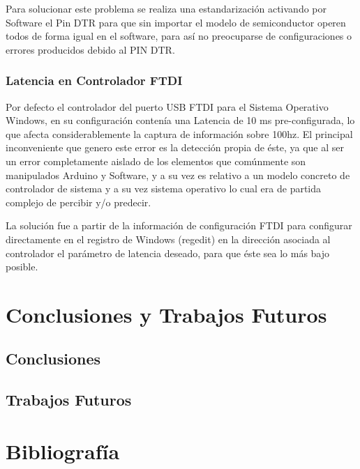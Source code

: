 \documentclass[12pt,a4paper]{article}
\begin{document}
Para solucionar este problema se realiza una estandarización activando por Software el Pin DTR para que sin importar el modelo de semiconductor operen todos de forma igual en el software, para así no preocuparse de configuraciones o errores producidos debido al PIN DTR.

\subsubsection{Latencia en Controlador FTDI}
Por defecto el controlador del puerto USB FTDI para el Sistema Operativo Windows, en su configuración contenía una Latencia de 10 ms pre-configurada, lo que afecta considerablemente la captura de información sobre 100hz. El principal inconveniente que genero este error es la detección propia de éste, ya que al ser un error completamente aislado de los elementos que comúnmente son manipulados Arduino y Software, y a su vez es relativo a un modelo concreto de controlador de sistema y a su vez sistema operativo lo cual era de partida complejo de percibir y/o predecir.

La solución fue a partir de la información de configuración FTDI\cite{FTDI} para configurar directamente  en el registro de Windows (regedit) en la dirección asociada al controlador el parámetro de latencia deseado, para que éste sea lo más bajo posible.

\section{Conclusiones y Trabajos Futuros}
\subsection{Conclusiones}
\subsection{Trabajos Futuros}

\section{Bibliografía}
\printbibliography[heading=none]
\end{document}
